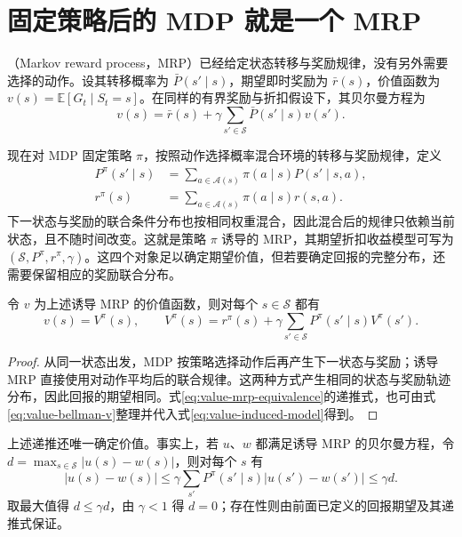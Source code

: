 \documentclass[UTF8]{ctexart}
\begin{document}
\section{固定策略后的 MDP 就是一个 MRP}
\label{sec:value-induced-mrp}

（Markov reward process，MRP）已经给定状态转移与奖励规律，没有另外需要选择的动作。设其转移概率为 $\bar P(s'\mid s)$，期望即时奖励为 $\bar r(s)$，价值函数为 $v(s)=\mathbb E[G_t\mid S_t=s]$。在同样的有界奖励与折扣假设下，其贝尔曼方程为
\begin{equation}
  v(s)=\bar r(s)+\gamma\sum_{s'\in\mathcal S}\bar P(s'\mid s)v(s').
  \label{eq:value-mrp-bellman}
\end{equation}

现在对 MDP 固定策略 $\pi$，按照动作选择概率混合环境的转移与奖励规律，定义
\begin{equation}
  \begin{aligned}
    P^\pi(s'\mid s)&=\sum_{a\in\mathcal A(s)}\pi(a\mid s)P(s'\mid s,a),\\
    r^\pi(s)&=\sum_{a\in\mathcal A(s)}\pi(a\mid s)r(s,a).
  \end{aligned}
  \label{eq:value-induced-model}
\end{equation}
下一状态与奖励的联合条件分布也按相同权重混合，因此混合后的规律只依赖当前状态，且不随时间改变。这就是策略 $\pi$ 诱导的 MRP，其期望折扣收益模型可写为 $(\mathcal S,P^\pi,r^\pi,\gamma)$。这四个对象足以确定期望价值，但若要确定回报的完整分布，还需要保留相应的奖励联合分布。

\begin{proposition}[两种表述评价同一个过程]
\label{prop:value-mrp-equivalence}
令 $v$ 为上述诱导 MRP 的价值函数，则对每个 $s\in\mathcal S$ 都有
\begin{equation}
  v(s)=V^\pi(s),\qquad
  V^\pi(s)=r^\pi(s)+\gamma\sum_{s'\in\mathcal S}P^\pi(s'\mid s)V^\pi(s').
  \label{eq:value-mrp-equivalence}
\end{equation}
\end{proposition}

\begin{proof}
从同一状态出发，MDP 按策略选择动作后再产生下一状态与奖励；诱导 MRP 直接使用对动作平均后的联合规律。这两种方式产生相同的状态与奖励轨迹分布，因此回报的期望相同。式\eqref{eq:value-mrp-equivalence}的递推式，也可由式\eqref{eq:value-bellman-v}整理并代入式\eqref{eq:value-induced-model}得到。
\end{proof}

上述递推还唯一确定价值。事实上，若 $u$、$w$ 都满足诱导 MRP 的贝尔曼方程，令 $d=\max_{s\in\mathcal S}|u(s)-w(s)|$，则对每个 $s$ 有
\[
  |u(s)-w(s)|
  \leq\gamma\sum_{s'}P^\pi(s'\mid s)|u(s')-w(s')|
  \leq\gamma d.
\]
取最大值得 $d\leq\gamma d$，由 $\gamma<1$ 得 $d=0$；存在性则由前面已定义的回报期望及其递推式保证。
\end{document}

